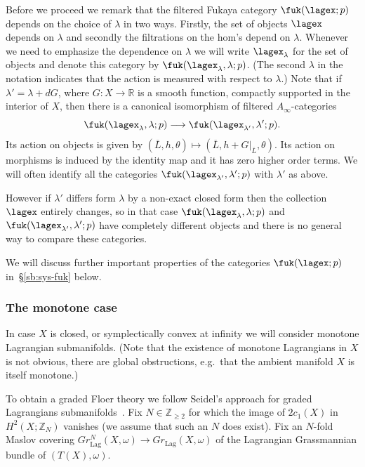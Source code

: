 Before we proceed we remark that the filtered Fukaya category
$\fuk(\lagex;p)$ depends on the choice of $\lambda$ in two
ways. Firstly, the set of objects $\lagex$ depends on $\lambda$ and
secondly the filtrations on the hom's depend  on $\lambda$.
Whenever we need to emphasize the dependence on $\lambda$ we will
write $\lagex_{\lambda}$ for the set of objects and denote this
category by $\fuk(\lagex_{\lambda}, \lambda ;p)$. (The second
$\lambda$ in the notation indicates that the action is measured with
respect to $\lambda$.) Note that if $\lambda' = \lambda + dG$, where
$G: X \longrightarrow \mathbb{R}$ is a smooth function, compactly
supported in the interior of $X$, then there is a canonical
isomorphism of filtered $A_{\infty}$-categories
\begin{equation} \label{eq:can-iso-fuk-lam} \fuk(\lagex_{\lambda},
  \lambda;p) \longrightarrow \fuk(\lagex_{\lambda'}, \lambda';p).
\end{equation}
Its action on objects is given by
$(\overline{L}, h, \theta) \longmapsto (\overline{L},
h+G|_{\overline{L}}, \theta)$. Its action on morphisms is induced by
the identity map and it has zero higher order terms. We will often
identify all the categories $ \fuk(\lagex_{\lambda'}, \lambda';p)$
with $\lambda'$ as above.

However if $\lambda'$ differs form $\lambda$ by a non-exact closed
form then the collection $\lagex$ entirely changes, so in that case
$\fuk(\lagex_{\lambda}, \lambda ;p)$ and
$\fuk(\lagex_{\lambda'}, \lambda' ;p)$ have completely different
objects and there is no general way to compare these categories.

We will discuss further important properties of the categories
$\fuk(\lagex;p)$ in~\S\ref{sb:sys-fuk} below.

\subsubsection{The monotone case} \label{sb:fuk-mon} In case $X$ is
closed, or symplectically convex at infinity we will consider monotone
Lagrangian submanifolds. (Note that the existence of monotone
Lagrangians in $X$ is not obvious, there are  global
obstructions, e.g.~that the ambient manifold $X$ is itself monotone.)

To obtain a graded Floer theory we follow Seidel's approach for graded
Lagrangians submanifolds~\cite{Se:graded}. Fix
$N \in \mathbb{Z}_{\geq 2}$ for which the image of $2c_1(X)$ in
$H^2(X; \mathbb{Z}_N)$ vanishes (we assume that such an $N$ does
exist). Fix an $N$-fold Maslov covering
$Gr^N_{\text{Lag}}(X, \omega) \longrightarrow Gr_{\text{Lag}}(X,
\omega)$ of the Lagrangian Grassmannian bundle of $(T(X), \omega)$.

